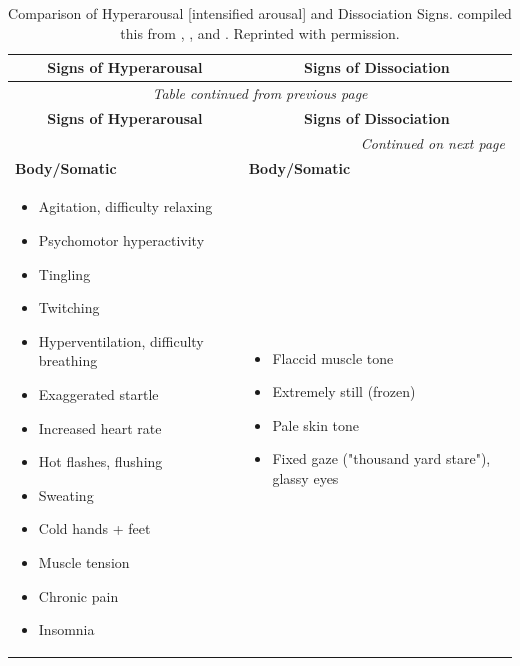 \documentclass[12pt,letterpaper]{book}
\newenvironment{compactitemize}
{\begin{itemize}[nosep, leftmargin=1em, itemsep=0pt, topsep=0pt]}
{\end{itemize}}
\begin{document}
\begin{longtable}{p{}|p{}}
\caption{Comparison of Hyperarousal [intensified arousal] and Dissociation Signs. \textcite{cheetahSigns} compiled this from \textcite{ogden2006sensorimotor}, \textcite{magyari2016teaching}, and \textcite{treleaven2018trauma}. Reprinted with permission.} \label{sec:signsofdc} \\

\toprule
\multicolumn{1}{c|}{\textbf{Signs of Hyperarousal}} & \multicolumn{1}{c}{\textbf{Signs of Dissociation}} \\
\midrule
\endfirsthead

\multicolumn{2}{c}{\textit{Table continued from previous page}} \\
\toprule
\multicolumn{1}{c|}{\textbf{Signs of Hyperarousal}} & \multicolumn{1}{c}{\textbf{Signs of Dissociation}} \\
\midrule
\endhead

\midrule
\multicolumn{2}{r}{\textit{Continued on next page}} \\
\endfoot

\bottomrule
\endlastfoot

\textbf{Body/Somatic} & \textbf{Body/Somatic} \\*
\begin{compactitemize}
\item Agitation, difficulty relaxing
\item Psychomotor hyperactivity
\item Tingling
\item Twitching
\item Hyperventilation, difficulty breathing
\item Exaggerated startle
\item Increased heart rate
\item Hot flashes, flushing
\item Sweating
\item Cold hands + feet
\item Muscle tension
\item Chronic pain
\item Insomnia
\end{compactitemize}
&
\begin{compactitemize}
\item Flaccid muscle tone
\item Extremely still (frozen)
\item Pale skin tone
\item Fixed gaze ("thousand yard stare"), glassy eyes
\end{compactitemize} \\[1ex]


\end{longtable}
\end{document}
